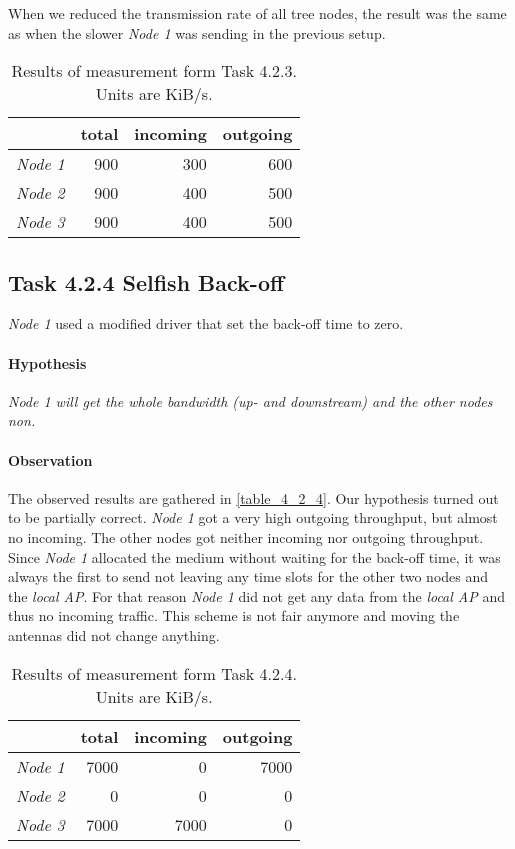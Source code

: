 \documentclass[12pt,a4paper]{article}
\begin{document}
When we reduced the transmission rate of all tree nodes, the result was the same as when the slower \emph{Node 1} was sending in the previous setup.

\begin{table}
	\begin{center}
		\begin{tabular}{r|r|r|r}\
		 & total & incoming & outgoing \\
		 \hline 
		 \emph{Node 1} & 900 & 300 & 600 \\
		 \emph{Node 2} & 900 & 400 & 500 \\
		 \emph{Node 3} & 900 & 400 & 500 \\
		\end{tabular}
		\label{table_4_2_3}
		\caption{Results of measurement form Task 4.2.3. Units are KiB/s.}
		
	\end{center}
	\end{table}

\subsection{Task 4.2.4 Selfish Back-off}
\emph{Node 1} used a modified driver that set the back-off time to zero.

\paragraph{Hypothesis}
\emph{Node 1 will get the whole bandwidth (up- and downstream) and the other nodes non.}

\paragraph{Observation}
The observed results are gathered in \autoref{table_4_2_4}.
Our hypothesis turned out to be partially correct.
\emph{Node 1} got a very high outgoing throughput, but almost no incoming.
The other nodes got neither incoming nor outgoing throughput.
Since \emph{Node 1} allocated the medium without waiting for the back-off time, it was always the first to send not leaving any time slots for the other two nodes and the \emph{local AP}. For that reason \emph{Node 1} did not get any data from the \emph{local AP} and thus no incoming traffic.
This scheme is not fair anymore and moving the antennas did not change anything.

\begin{table}
	\begin{center}
		\begin{tabular}{r|r|r|r}\
		 & total & incoming & outgoing \\
		 \hline 
		 \emph{Node 1} & 7000 & $~$0 & 7000 \\
		 \emph{Node 2} & ~0 & ~0 & ~0 \\
		 \emph{Node 3} & 7000 & 7000 & ~0 \\
		\end{tabular}
		\label{table_4_2_4}
		\caption{Results of measurement form Task 4.2.4. Units are KiB/s.}
		
	\end{center}
	\end{table}
\end{document}
